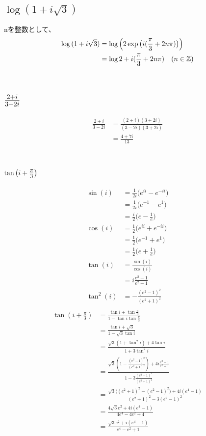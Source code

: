 \documentclass[dvipdfmx,a4paper]{jsarticle}
\begin{document}
\subsection{$\log{(1 + i\sqrt{3})}$}
nを整数として、
\begin{align*}
\log{(1 + i\sqrt{3})} &= \log{\Bigl(2\exp{\bigl(i(\frac{\pi}{3} + 2n\pi )\bigr)}\Bigr)}\\
&= \log{2} + i(\frac{\pi}{3} + 2n\pi) \quad (n \in \mathbb{Z})
\end{align*}
\\
\subsection{$\mbox{\Large$\frac{2+i}{3-2i}$}$}
\begin{align*}
\frac{2+i}{3-2i} &= \frac{(2+i)(3+2i)}{(3-2i)(3+2i)}\\
&= \frac{4 + 7i}{13}
\end{align*}
\\
\subsection{$\tan{\bigl(i + \mbox{\large$\frac{\pi}{3}$}\bigr)}$}
\begin{align*}
\sin{(i)} &= \frac{1}{2i}\bigl(e^{ii} - e^{-ii}\bigr)\\
&= \frac{1}{2i}\bigl(e^{-1} - e^{1}\bigr)\\
&= \frac{i}{2}\bigl(e - \frac{1}{e}\bigr)\\
\cos{(i)} &= \frac{1}{2}\bigl(e^{ii} + e^{-ii}\bigr)\\
&= \frac{1}{2}\bigl(e^{-1} + e^{1}\bigr)\\
&= \frac{1}{2}\bigl(e + \frac{1}{e}\bigr)\\
\tan{(i)} &= \frac{\sin{(i)}}{\cos{(i)}}\\
&= i \frac{e^2-1}{e^2+1}\\
\tan^2{(i)}&= -\frac{(e^2-1)^2}{(e^2+1)^2}\\
\end{align*}
\begin{align*}
\tan{(i + \frac{\pi}{3})} &= \frac{\tan{i}+\tan{\frac{\pi}{3}}}{1 - \tan{i}\tan{\frac{\pi}{3}}}\\
&= \frac{\tan{i}+\sqrt{3}}{1 - \sqrt{3}\tan{i}}\\
&= \frac{\sqrt{3}(1 + \tan^2{i}) + 4\tan{i}}{1 + 3\tan^2{i}}\\
&= \frac{\sqrt{3}(1 -\frac{(e^2-1)^2}{(e^2+1)^2}) + 4i \frac{e^2-1}{e^2+1}}{1 - 3\frac{(e^2-1)^2}{(e^2+1)^2}}\\
&= \frac{\sqrt{3}\bigl((e^2+1)^2 - (e^2-1)^2\bigr) + 4i (e^4-1)}{(e^2+1)^2 - 3(e^2-1)^2}\\
&= \frac{4\sqrt{3}e^2 + 4i (e^4-1)}{4e^4 - 4e^2 + 4}\\
&= \frac{\sqrt{3}e^2 + i (e^4-1)}{e^4 - e^2 + 1}
\end{align*}
\\\\
\end{document}
